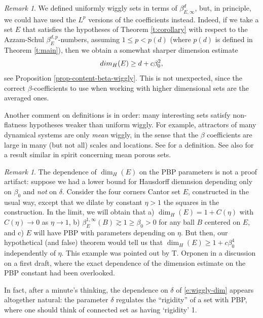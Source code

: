 \documentclass[11pt,reqno]{amsart}
\def\dim{\mathop\mathrm{dim}} 					%
\theoremstyle{definition}
\theoremstyle{remark}
\newtheorem{remark}[theorem]{Remark}
\numberwithin{equation}{section}
\theoremstyle{theorem}
\theoremstyle{definition}
\theoremstyle{remark}
\numberwithin{equation}{section}
\begin{document}
	\begin{remark}
		We defined uniformly wiggly sets in terms of $\beta_{E,\infty}^d$, but, in principle, we could have used the $L^p$ versions of the coefficients instead. Indeed, if we take a set $E$ that satisfies the hypotheses of Theorem \ref{t:corollary} with respect to the Azzam-Schul $\beta_E^{d,p}$-numbers, assuming $1 \leq p < p(d)$ (where $p(d)$ is defined in Theorem \ref{t:main}), then we obtain a somewhat sharper dimension estimate
		\begin{equation}
			{\rm dim}_H (E) \geq d+  c \beta_0^{2},
		\end{equation}
	see Proposition \ref{prop-content-beta-wiggly}. This is not unexpected, since the correct $\beta$-coefficients to use when working with higher dimensional sets are the averaged ones.

	Another comment on definitions is in order: many interesting sets satisfy non-flatness hypotheses weaker than uniform wiggly. For example, attractors of many dynamical systems are only \textit{mean} wiggly, in the sense that the $\beta$ coefficients are large in many (but not all) scales and locations. See \cite{graczyk2012metric, graczyk2022optimal} for a definition. See also \cite{koskela1997hausdorff} for a result similar in spirit concerning mean porous sets. 
	\end{remark}
	
	\begin{remark}
	 The dependence of $\dim_H(E)$ on the PBP parameters is not a proof artifact: suppose we had a lower bound for Hausdorff diemnsion depending only on $\beta_0$ and \textit{not} on $\delta$. Consider the four corners Cantor set $E$, constructed in the usual way, except that we dilate by constant $\eta>1$ the squares in the construction. In the limit, we will obtain that a) $\dim_{H}(E) = 1 + C(\eta)$ with $C(\eta)\to 0$ as $\eta\to 1$, b) $\beta_E^{1,\infty}(B)\gtrsim 1 \geq \beta_0>0$ for any ball $B$ centered on $E$, and c) $E$ will have PBP with parameters depending on $\eta$. But then, our hypothetical (and false) theorem would tell us that $\dim_{H}(E) \geq 1+ c \beta_0^4$ independently of $\eta$. 
	  This example was pointed out by T. Orponen in a discussion on a first draft, where the exact dependence of the dimension estimate on the PBP constant had been overlooked. 
	  
	  In fact, after a minute's thinking, the dependence on $\delta$ of \eqref{e:wiggly-dim} appears altogether natural: the parameter $\delta$ regulates the ``rigidity'' of a set with PBP, where one should think of connected set as having `rigidity' 1.
	\end{remark}
\end{document}
